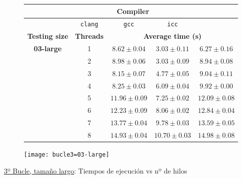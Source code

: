 \begin{figure}[H]
    \centering
    \begin{subfigure}{0.4\textwidth}
        \begin{adjustbox}{width=\textwidth} 
        \begin{tabular}{|c|c|c|c|c|}
            \hline
            \rowcolor{azul} \multicolumn{2}{|c|}{}&\multicolumn{3}{c|}{\textbf{Compiler}} \\ \hline
            \rowcolor{azul} \multicolumn{2}{|c|}{}&\texttt{clang}&\texttt{gcc}&\texttt{icc}\\ \hline
            \rowcolor{azul} \textbf{Testing size} & \textbf{Threads}&\multicolumn{3}{c|}{\textbf{Average time (s)}} \\ \hline
            \multirow{8}{1cm}{\textbf{03-large}} & 1 & \(8.62\pm{0.04}\) & \(3.03\pm{0.11}\) & \(6.27\pm{0.16}\) \\ \cline{2-5}
            & 2 & \(8.98\pm{0.06}\) & \(3.03\pm{0.09}\) & \(8.94\pm{0.08}\) \\ \cline{2-5}
            & 3 & \(8.15\pm{0.07}\) & \(4.77\pm{0.05}\) & \(9.04\pm{0.11}\) \\ \cline{2-5}
            & 4 & \(8.25\pm{0.03}\) & \(6.09\pm{0.04}\) & \(9.92\pm{0.00}\) \\ \cline{2-5}
            & 5 & \(11.96\pm{0.09}\) & \(7.25\pm{0.02}\) & \(12.09\pm{0.08}\) \\ \cline{2-5}
            & 6 & \(12.23\pm{0.09}\) & \(8.06\pm{0.02}\) & \(12.84\pm{0.04}\) \\ \cline{2-5}
            & 7 & \(13.77\pm{0.04}\) & \(9.78\pm{0.03}\) & \(13.59\pm{0.05}\) \\ \cline{2-5}
            & 8 & \(14.93\pm{0.04}\) & \(10.70\pm{0.03}\) & \(14.98\pm{0.08}\) \\ \hline
        \end{tabular}
        \end{adjustbox}
    \end{subfigure}
    \hfill
    \begin{subfigure}{0.5\textwidth}
        \texttt{[image: bucle3=03-large]}
    \end{subfigure}
    \caption{\underline{3º Bucle, tamaño largo}: Tiempos de ejecución vs nº de hilos}
    \label{bucle3=03-large}
\end{figure}
